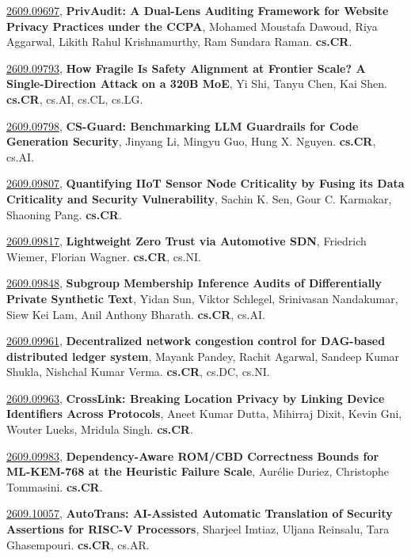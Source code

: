 \documentclass[9pt, a4paper]{article}
\theoremstyle{plain}
\theoremstyle{definition}
\theoremstyle{remark}
\newcommand{\arxivwithtarget}[3]{\hypertarget{#1}{}\href{https://arxiv.org/abs/#1}{#1}, \textbf{\textcolor{arxivblue}{#2}}, #3. }
\begin{document}
\arxivwithtarget{2609.09697}{PrivAudit: A Dual-Lens Auditing Framework for Website Privacy Practices under the CCPA}{Mohamed Moustafa Dawoud, Riya Aggarwal, Likith Rahul Krishnamurthy, Ram Sundara Raman}\textbf{cs.CR}.



\arxivwithtarget{2609.09793}{How Fragile Is Safety Alignment at Frontier Scale? A Single-Direction Attack on a 320B MoE}{Yi Shi, Tanyu Chen, Kai Shen}\textbf{cs.CR}, cs.AI, cs.CL, cs.LG.



\arxivwithtarget{2609.09798}{CS-Guard: Benchmarking LLM Guardrails for Code Generation Security}{Jinyang Li, Mingyu Guo, Hung X. Nguyen}\textbf{cs.CR}, cs.AI.



\arxivwithtarget{2609.09807}{Quantifying IIoT Sensor Node Criticality by Fusing its Data Criticality and Security Vulnerability}{Sachin K. Sen, Gour C. Karmakar, Shaoning Pang}\textbf{cs.CR}.



\arxivwithtarget{2609.09817}{Lightweight Zero Trust via Automotive SDN}{Friedrich Wiemer, Florian Wagner}\textbf{cs.CR}, cs.NI.



\arxivwithtarget{2609.09848}{Subgroup Membership Inference Audits of Differentially Private Synthetic Text}{Yidan Sun, Viktor Schlegel, Srinivasan Nandakumar, Siew Kei Lam, Anil Anthony Bharath}\textbf{cs.CR}, cs.AI.



\arxivwithtarget{2609.09961}{Decentralized network congestion control for DAG-based distributed ledger system}{Mayank Pandey, Rachit Agarwal, Sandeep Kumar Shukla, Nishchal Kumar Verma}\textbf{cs.CR}, cs.DC, cs.NI.



\arxivwithtarget{2609.09963}{CrossLink: Breaking Location Privacy by Linking Device Identifiers Across Protocols}{Aneet Kumar Dutta, Mihirraj Dixit, Kevin Gni, Wouter Lueks, Mridula Singh}\textbf{cs.CR}.



\arxivwithtarget{2609.09983}{Dependency-Aware ROM/CBD Correctness Bounds for ML-KEM-768 at the Heuristic Failure Scale}{Aurélie Duriez, Christophe Tommasini}\textbf{cs.CR}.



\arxivwithtarget{2609.10057}{AutoTrans: AI-Assisted Automatic Translation of Security Assertions for RISC-V Processors}{Sharjeel Imtiaz, Uljana Reinsalu, Tara Ghasempouri}\textbf{cs.CR}, cs.AR.
\end{document}
